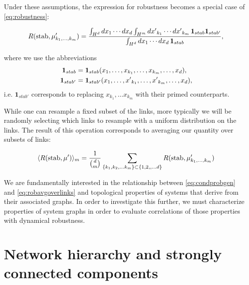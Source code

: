 Under these assumptions, the expression for robustness becomes a special case of \ref{eq:robustness}:
\begin{widetext}
\begin{equation}\label{eq:condprobgen}
 R (\mathrm{stab}, \mu'_{k_1, \ldots, k_m}) =
  \frac{\int_{H^d} dx_1 \cdots dx_d \int_{H^m} {dx'}_{k_1} \cdots {dx'}_{k_m}\,
    \mathbf{1}_{stab} \mathbf{1}_{stab'}}
  {\int_{H^d} dx_1 \cdots dx_d  \, \mathbf{1}_{stab}},
\end{equation}
\end{widetext}
where we use the abbreviations
\begin{align*}
\mathbf{1}_{stab} &= \mathbf{1}_{stab}(x_1, \ldots, x_{k_1}, \ldots, x_{k_m}, \ldots, x_d), \\
\mathbf{1}_{stab'} &= \mathbf{1}_{stab'}(x_1, \ldots, {x'}_{k_1}, \ldots, {x'}_{k_m},  \ldots, x_d),
\end{align*}
i.e. $\mathbf{1}_{stab'}$ corresponds to replacing $x_{k_1}, \ldots x_{k_m}$ with their primed counterparts.

While one can resample a fixed subset of the links, more typically we will be randomly selecting which links to resample with a uniform distribution on the links.  The result of this operation corresponds to averaging our quantity over subsets of links:
\begin{widetext}
\begin{equation}\label{eq:robavgoverlinks}
\langle R (\hbox{stab}, \mu') \rangle_m =
\frac{1}{\binom{d}{m}}
\sum_{\{k_1, k_2, \ldots k_m\} \subset \{1, 2,, \ldots d\}}
R (\hbox{stab}, \mu'_{k_1, \ldots, k_m})
\end{equation}
\end{widetext}
We are fundamentally interested in the relationship between \ref{eq:condprobgen} and \ref{eq:robavgoverlinks} and topological properties of systems that derive from their associated graphs. In order to investigate this further, we must characterize properties of system graphs in order to evaluate correlations of those properties with dynamical robustness.

\section{Network hierarchy and strongly connected components}

